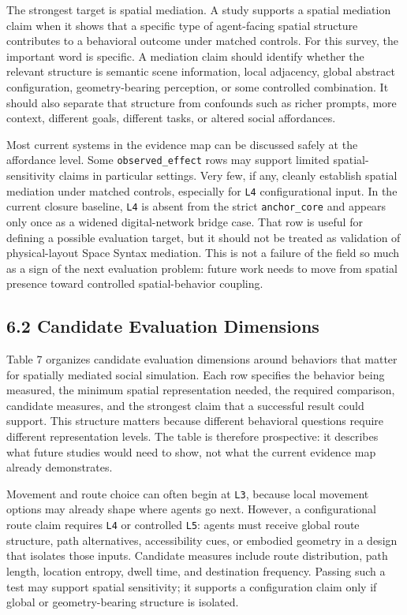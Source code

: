 \documentclass[
  twocolumn]{article}
\begin{document}
The strongest target is spatial mediation. A study supports a spatial
mediation claim when it shows that a specific type of agent-facing
spatial structure contributes to a behavioral outcome under matched
controls. For this survey, the important word is specific. A mediation
claim should identify whether the relevant structure is semantic scene
information, local adjacency, global abstract configuration,
geometry-bearing perception, or some controlled combination. It should
also separate that structure from confounds such as richer prompts, more
context, different goals, different tasks, or altered social
affordances.

Most current systems in the evidence map can be discussed safely at the
affordance level. Some \texttt{observed\_effect} rows may support
limited spatial-sensitivity claims in particular settings. Very few, if
any, cleanly establish spatial mediation under matched controls,
especially for \texttt{L4} configurational input. In the current closure
baseline, \texttt{L4} is absent from the strict \texttt{anchor\_core}
and appears only once as a widened digital-network bridge case. That row
is useful for defining a possible evaluation target, but it should not
be treated as validation of physical-layout Space Syntax mediation. This
is not a failure of the field so much as a sign of the next evaluation
problem: future work needs to move from spatial presence toward
controlled spatial-behavior coupling.

\subsection{6.2 Candidate Evaluation
Dimensions}\label{candidate-evaluation-dimensions}

Table 7 organizes candidate evaluation dimensions around behaviors that
matter for spatially mediated social simulation. Each row specifies the
behavior being measured, the minimum spatial representation needed, the
required comparison, candidate measures, and the strongest claim that a
successful result could support. This structure matters because
different behavioral questions require different representation levels.
The table is therefore prospective: it describes what future studies
would need to show, not what the current evidence map already
demonstrates.

Movement and route choice can often begin at \texttt{L3}, because local
movement options may already shape where agents go next. However, a
configurational route claim requires \texttt{L4} or controlled
\texttt{L5}: agents must receive global route structure, path
alternatives, accessibility cues, or embodied geometry in a design that
isolates those inputs. Candidate measures include route distribution,
path length, location entropy, dwell time, and destination frequency.
Passing such a test may support spatial sensitivity; it supports a
configuration claim only if global or geometry-bearing structure is
isolated.
\end{document}
